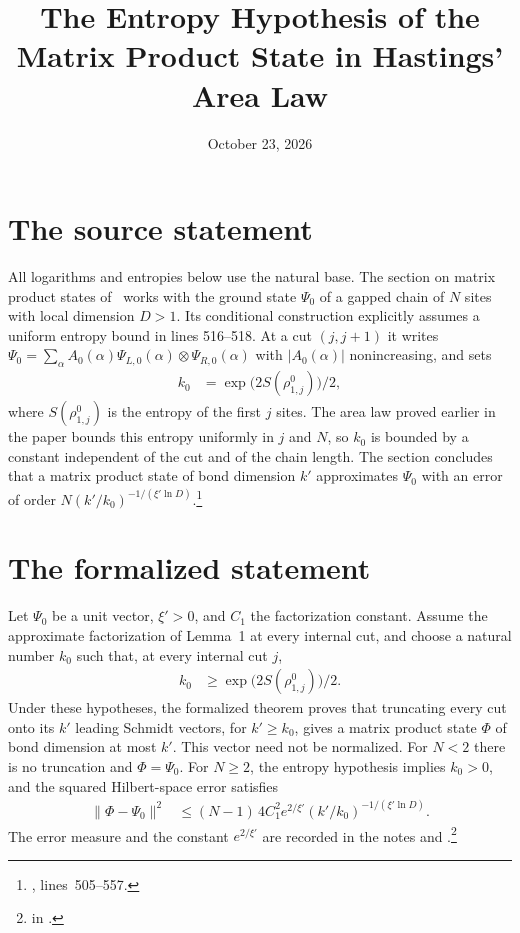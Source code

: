 \documentclass{article}
\title{The Entropy Hypothesis of the Matrix Product State in Hastings' Area Law}
\author{}
\date{October 23, 2026}
\begin{document}
\maketitle
{}

\section{The source statement}

All logarithms and entropies below use the natural base.
The section on matrix product states of~\cite{Hastings2007AreaLaw} works
with the ground state $\Psi_0$ of a gapped chain of $N$ sites with local
dimension $D>1$. Its conditional construction explicitly assumes a uniform
entropy bound in lines 516--518. At a cut $(j,j+1)$ it writes
$\Psi_0=\sum_\alpha A_0(\alpha)\Psi_{L,0}(\alpha)\otimes\Psi_{R,0}(\alpha)$
with $\lvert A_0(\alpha)\rvert$ nonincreasing, and sets
\begin{align}
    k_0 & =\exp\bigl(2S(\rho^0_{1,j})\bigr)/2,
    \label{eq:hastings07_mps_entropy_stage_k0}
\end{align}
where $S(\rho^0_{1,j})$ is the entropy of the first $j$ sites. The area law
proved earlier in the paper bounds this entropy uniformly in $j$ and $N$, so
$k_0$ is bounded by a constant independent of the cut and of the chain
length. The section concludes that a matrix product state of bond dimension
$k'$ approximates $\Psi_0$ with an error of order
$N(k'/k_0)^{-1/(\xi'\ln D)}$.\footnote{,
    lines~505--557.}

\section{The formalized statement}

Let $\Psi_0$ be a unit vector, $\xi'>0$, and $C_1$ the factorization
constant. Assume the approximate factorization of Lemma~1 at every internal
cut, and choose a natural number $k_0$ such that, at every internal cut $j$,
\begin{align}
    k_0 & \ge\exp\bigl(2S(\rho^0_{1,j})\bigr)/2.
    \label{eq:hastings07_mps_entropy_stage_hyp}
\end{align}
Under these hypotheses, the formalized theorem proves that truncating every
cut onto its $k'$
leading Schmidt vectors, for $k'\ge k_0$, gives a matrix product state $\Phi$
of bond dimension at most $k'$. This vector need not be normalized. For
$N<2$ there is no truncation and $\Phi=\Psi_0$. For $N\ge2$, the entropy
hypothesis implies $k_0>0$, and the squared Hilbert-space error satisfies
\begin{align}
    \lVert\Phi-\Psi_0\rVert^2
     & \le(N-1)\,4C_1^2e^{2/\xi'}(k'/k_0)^{-1/(\xi'\ln D)}.
    \label{eq:hastings07_mps_entropy_stage_bound}
\end{align}
The error measure and the constant $e^{2/\xi'}$ are recorded in the notes
 and
.\footnote{
    in .}
\end{document}
